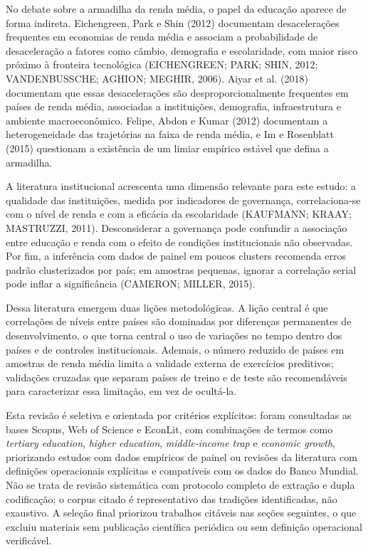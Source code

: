 \documentclass[12pt,a4paper]{article}
\begin{document}
No debate sobre a armadilha da renda média, o papel da educação aparece de forma indireta. Eichengreen, Park e Shin (2012) documentam desacelerações frequentes em economias de renda média e associam a probabilidade de desaceleração a fatores como câmbio, demografia e escolaridade, com maior risco próximo à fronteira tecnológica (EICHENGREEN; PARK; SHIN, 2012; VANDENBUSSCHE; AGHION; MEGHIR, 2006). Aiyar et al. (2018) documentam que essas desacelerações são desproporcionalmente frequentes em países de renda média, associadas a instituições, demografia, infraestrutura e ambiente macroeconômico. Felipe, Abdon e Kumar (2012) documentam a heterogeneidade das trajetórias na faixa de renda média, e Im e Rosenblatt (2015) questionam a existência de um limiar empírico estável que defina a armadilha.

A literatura institucional acrescenta uma dimensão relevante para este estudo: a qualidade das instituições, medida por indicadores de governança, correlaciona-se com o nível de renda e com a eficácia da escolaridade (KAUFMANN; KRAAY; MASTRUZZI, 2011). Desconsiderar a governança pode confundir a associação entre educação e renda com o efeito de condições institucionais não observadas. Por fim, a inferência com dados de painel em poucos clusters recomenda erros padrão clusterizados por país; em amostras pequenas, ignorar a correlação serial pode inflar a significância (CAMERON; MILLER, 2015).

Dessa literatura emergem duas lições metodológicas. A lição central é que correlações de níveis entre países são dominadas por diferenças permanentes de desenvolvimento, o que torna central o uso de variações no tempo dentro dos países e de controles institucionais. Ademais, o número reduzido de países em amostras de renda média limita a validade externa de exercícios preditivos; validações cruzadas que separam países de treino e de teste são recomendáveis para caracterizar essa limitação, em vez de ocultá-la.

Esta revisão é seletiva e orientada por critérios explícitos: foram consultadas as bases Scopus, Web of Science e EconLit, com combinações de termos como \textit{tertiary education}, \textit{higher education}, \textit{middle-income trap} e \textit{economic growth}, priorizando estudos com dados empíricos de painel ou revisões da literatura com definições operacionais explícitas e compatíveis com os dados do Banco Mundial. Não se trata de revisão sistemática com protocolo completo de extração e dupla codificação; o corpus citado é representativo das tradições identificadas, não exaustivo. A seleção final priorizou trabalhos citáveis nas seções seguintes, o que excluiu materiais sem publicação científica periódica ou sem definição operacional verificável.
\end{document}
